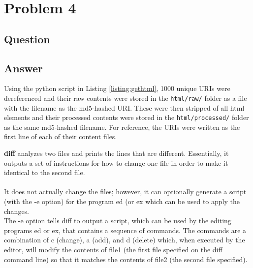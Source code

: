 \section{Problem 4}

\subsection{Question}
\vspace*{10pt}


\subsection{Answer}
\vspace{2mm}
Using the python script in Listing \ref{listing:gethtml}, 1000 unique URIs were dereferenced and
their raw contents were stored in the {\tt html/raw/} folder as a file with the filename as the
md5-hashed URI. These were then stripped of all html elements and their processed contents were 
stored in the {\tt html/processed/} folder as the same md5-hashed filename. For reference, the URIs were written as the first line of each of their content files.
\vspace{5mm}

\vspace*{5pt}


\vspace*{5pt}


\textbf{diff} analyzes two files and prints the lines that are different. Essentially, it outputs a set of instructions for how to change one file in order to make it identical to the second file.\\
\\
It does not actually change the files; however, it can optionally generate a script (with the -e option) for the program ed (or ex which can be used to apply the changes.\\
The -e option tells diff to output a script, which can be used by the editing programs ed or ex, that contains a sequence of commands. The commands are a combination of c (change), a (add), and d (delete) which, when executed by the editor, will modify the contents of file1 (the first file specified on the diff command line) so that it matches the contents of file2 (the second file specified).





